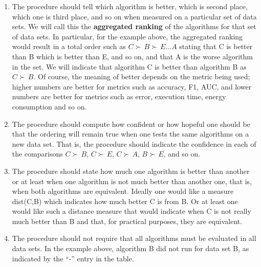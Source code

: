 \documentclass[twoside,11pt,preprint]{article}
\begin{document}
\begin{enumerate}
\def\labelenumi{\arabic{enumi}.}
\item
  The procedure should tell which algorithm is better, which is second place, which one
  is third place, and so on when measured on a particular set of data
  sets. We will call this the \textbf{aggregated ranking} of the
  algorithms for that set of data sets. In particular, for the example above, the aggregated ranking would result in a total order such as \(C \succ\,B \succ\,E \hdots A\) stating that C is better than B which is better than E, and so on, and that A is the worse algorithm in the set. We will indicate that algorithm C is better than algorithm B as \(C \succ\,B\). Of course, the meaning of better depends on the metric being used; higher numbers are better for metrics such as accuracy, F1, AUC, and lower numbers are better for metrics such as error, execution time, energy consumption and so on.
\item
  The procedure should compute how confident or how hopeful one should be that the ordering
  will remain true when one tests the same algorithms on a new
  data set. That is, the procedure should indicate the confidence in each of the comparisons \(C \succ\,B\), \(C \succ\,E\), \(C \succ\,A\), \(B \succ\,E\), and so on.
\item
  The procedure should state how much one algorithm is
  better than another or at least when one algorithm is not much
  better than another one, that is, when both algorithms are equivalent. Ideally one would like a measure dist(C,B) which indicates how much better C is from B. Or at least one would like such a distance measure that would indicate when C is not really much better than B and that, for practical purposes, they are equivalent.
\item
  The procedure should not require that all algorithms must be evaluated in all data sets. In the example above, algorithm B did not run for data set B, as indicated by the ``-'' entry in the table.
\end{enumerate}
\end{document}
